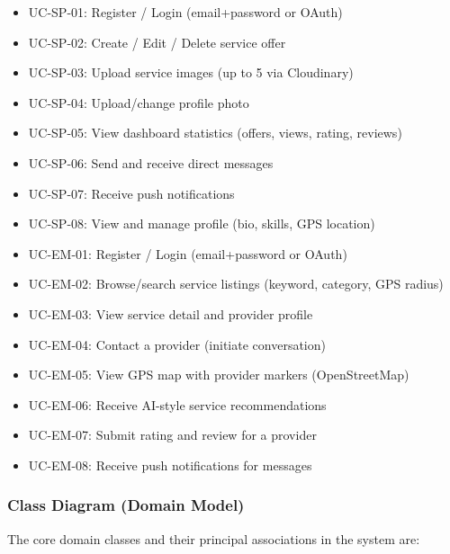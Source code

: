 \documentclass[12pt,a4paper]{report}
\begin{document}
\begin{tcolorbox}[noteboxstyle, title={Use Cases -- Service Provider}]
\begin{itemize}[noitemsep, leftmargin=*]
  \item UC-SP-01: Register / Login (email+password or OAuth)
  \item UC-SP-02: Create / Edit / Delete service offer
  \item UC-SP-03: Upload service images (up to 5 via Cloudinary)
  \item UC-SP-04: Upload/change profile photo
  \item UC-SP-05: View dashboard statistics (offers, views, rating, reviews)
  \item UC-SP-06: Send and receive direct messages
  \item UC-SP-07: Receive push notifications
  \item UC-SP-08: View and manage profile (bio, skills, GPS location)
\end{itemize}
\end{tcolorbox}

\begin{tcolorbox}[warningboxstyle, title={Use Cases -- Employer}]
\begin{itemize}[noitemsep, leftmargin=*]
  \item UC-EM-01: Register / Login (email+password or OAuth)
  \item UC-EM-02: Browse/search service listings (keyword, category, GPS radius)
  \item UC-EM-03: View service detail and provider profile
  \item UC-EM-04: Contact a provider (initiate conversation)
  \item UC-EM-05: View GPS map with provider markers (OpenStreetMap)
  \item UC-EM-06: Receive AI-style service recommendations
  \item UC-EM-07: Submit rating and review for a provider
  \item UC-EM-08: Receive push notifications for messages
\end{itemize}
\end{tcolorbox}

\subsubsection{Class Diagram (Domain Model)}

The core domain classes and their principal associations in the system are:
\end{document}
